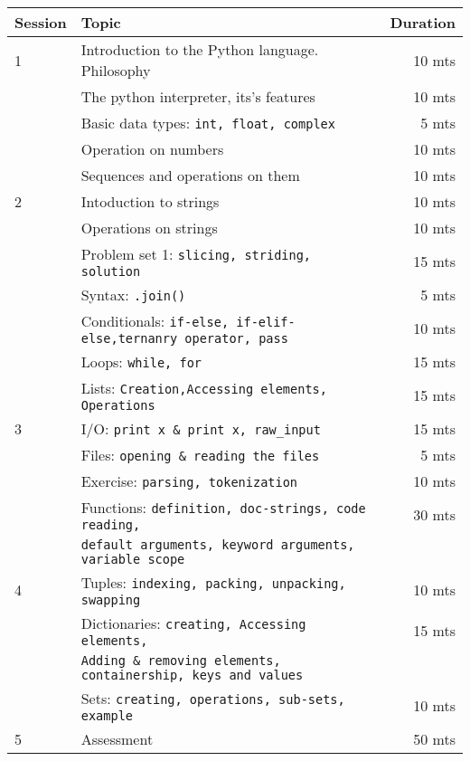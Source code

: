 \documentclass{article}
\begin{document}
\begin{tabular}{llr}
\hline
Session & Topic & Duration\\\hline
1 & Introduction to the Python language. Philosophy                  & 10 mts\\
  & The python interpreter, its's features                           & 10 mts \\
  & Basic data types: \tt{int, float, complex}                       & ~5 mts \\
  & Operation on numbers                                             & 10 mts\\
  & Sequences and operations on them                                 & 10 mts\\\hline

2 & Intoduction to strings                                           & 10 mts\\
  & Operations on strings                                            & 10 mts\\
  & Problem set 1: \tt{slicing, striding, solution}                  & 15 mts\\
  & Syntax: \tt{.join()}                                             & ~5 mts\\
  & Conditionals: \tt{if-else, if-elif-else,ternanry operator, pass} & 10 mts\\
  & Loops: \tt{while, for}                                           & 15 mts\\
  & Lists: \tt{Creation,Accessing elements, Operations}              & 15 mts\\\hline

3 & I/O: \tt{print x \& print x, raw\_input}                         & 15 mts\\
  & Files: \tt{opening \& reading the files}                         & ~5 mts\\
  & Exercise: \tt{parsing, tokenization}                             & 10 mts\\
  & Functions: \tt{definition, doc-strings, code reading,}           & 30 mts\\
  & \tt{default arguments, keyword arguments, variable scope}        &\\\hline

4 & Tuples: \tt{indexing, packing, unpacking, swapping}               & 10 mts\\
  & Dictionaries: \tt{creating, Accessing elements,}                  & 15 mts\\
  & \tt{Adding \& removing elements, containership, keys and values}  &\\
  & Sets: \tt{creating, operations, sub-sets, example}                & 10 mts\\\hline

5 & Assessment                                                        & 50 mts\\\hline\hline
\end{tabular}
\end{document}

